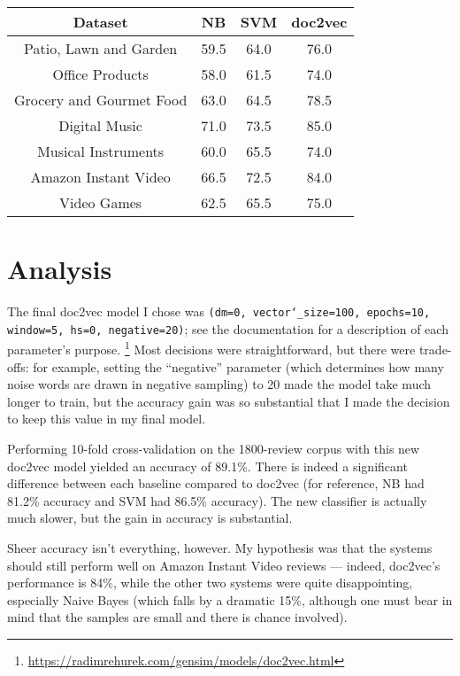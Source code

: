 \documentclass[12pt,a4paper,twoside]{article}
\begin{document}
\vspace{16px}

\begin{center}
\begin{tabular}{|c|c|c|c|}
\hline
\textbf{Dataset} & \textbf{NB} & \textbf{SVM} & \textbf{doc2vec}\\ \hline

Patio, Lawn and Garden & 59.5 & 64.0 & 76.0 \\ \hline
Office Products & 58.0 & 61.5 & 74.0 \\ \hline
Grocery and Gourmet Food & 63.0 & 64.5 & 78.5 \\ \hline
Digital Music & 71.0 & 73.5 & 85.0 \\ \hline
Musical Instruments & 60.0 & 65.5 & 74.0 \\ \hline
Amazon Instant Video & 66.5 & 72.5 & 84.0 \\ \hline
Video Games & 62.5 & 65.5 & 75.0 \\ \hline

\end{tabular}
\end{center}

\vspace{10px}

\section{Analysis}

The final doc2vec model I chose was \texttt{(dm=0, vector\char`_size=100, epochs=10, window=5, hs=0, negative=20)}; see the documentation for a description of each parameter's purpose. \footnote{\url{https://radimrehurek.com/gensim/models/doc2vec.html}} Most decisions were straightforward, but there were trade-offs: for example, setting the ``negative'' parameter (which determines how many noise words are drawn in negative sampling) to 20 made the model take much longer to train, but the accuracy gain was so substantial that I made the decision to keep this value in my final model.

Performing 10-fold cross-validation on the 1800-review corpus with this new doc2vec model yielded an accuracy of 89.1\%. There is indeed a significant difference between each baseline compared to doc2vec (for reference, NB had 81.2\% accuracy and SVM had 86.5\% accuracy). The new classifier is actually much slower, but the gain in accuracy is substantial.

Sheer accuracy isn't everything, however. My hypothesis was that the systems should still perform well on Amazon Instant Video reviews --- indeed, doc2vec's performance is 84\%, while the other two systems were quite disappointing, especially Naive Bayes (which falls by a dramatic 15\%, although one must bear in mind that the samples are small and there is chance involved).
\end{document}
